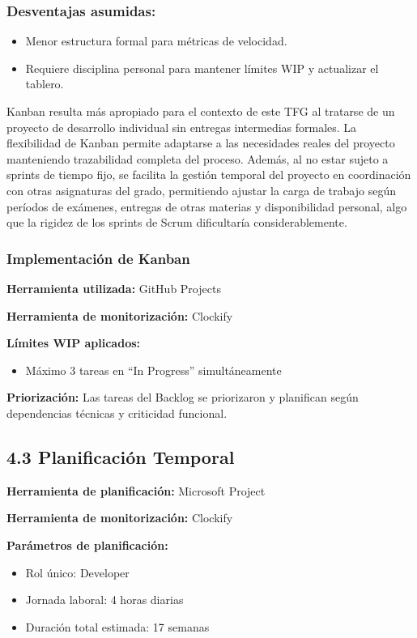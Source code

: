\subsubsection{Desventajas asumidas:}

\begin{itemize}
    \item Menor estructura formal para métricas de velocidad.
    \item Requiere disciplina personal para mantener límites WIP y actualizar el tablero.
\end{itemize}

Kanban resulta más apropiado para el contexto de este TFG al tratarse de un proyecto de desarrollo individual 
sin entregas intermedias formales. La flexibilidad de Kanban permite adaptarse a las
 necesidades reales del proyecto manteniendo trazabilidad completa del proceso. Además, 
 al no estar sujeto a sprints de tiempo fijo, se facilita la gestión temporal del
  proyecto en coordinación con otras asignaturas del grado, permitiendo ajustar la carga de
   trabajo según períodos de exámenes, entregas de otras materias y disponibilidad personal, 
   algo que la rigidez de los sprints de Scrum dificultaría considerablemente.

\subsubsection{Implementación de Kanban}

\textbf{Herramienta utilizada:} GitHub Projects

\textbf{Herramienta de monitorización:} Clockify

\textbf{Límites WIP aplicados:}
\begin{itemize}
    \item Máximo 3 tareas en ``In Progress'' simultáneamente
\end{itemize}

\textbf{Priorización:} Las tareas del Backlog se priorizaron y planifican según dependencias técnicas y criticidad funcional.

\subsection{4.3 Planificación Temporal}

\textbf{Herramienta de planificación:} Microsoft Project

\textbf{Herramienta de monitorización:} Clockify

\textbf{Parámetros de planificación:}
\begin{itemize}
    \item Rol único: Developer
    \item Jornada laboral: 4 horas diarias
    \item Duración total estimada: 17 semanas
\end{itemize}

